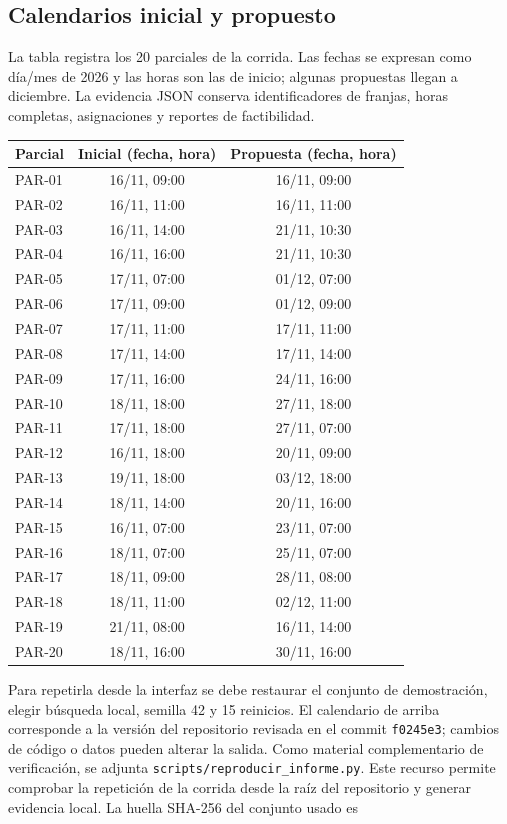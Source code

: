 \documentclass[12pt,letterpaper]{article}
\begin{document}
\subsection{Calendarios inicial y propuesto}
La tabla registra los 20 parciales de la corrida. Las fechas se expresan como día/mes de 2026 y las horas son las de inicio; algunas propuestas llegan a diciembre. La evidencia JSON conserva identificadores de franjas, horas completas, asignaciones y reportes de factibilidad.
\begin{center}
\begingroup\singlespacing\small
\begin{tabular}{lcc}
\toprule
Parcial & Inicial (fecha, hora) & Propuesta (fecha, hora)\\
\midrule
PAR-01 & 16/11, 09:00 & 16/11, 09:00\\
PAR-02 & 16/11, 11:00 & 16/11, 11:00\\
PAR-03 & 16/11, 14:00 & 21/11, 10:30\\
PAR-04 & 16/11, 16:00 & 21/11, 10:30\\
PAR-05 & 17/11, 07:00 & 01/12, 07:00\\
PAR-06 & 17/11, 09:00 & 01/12, 09:00\\
PAR-07 & 17/11, 11:00 & 17/11, 11:00\\
PAR-08 & 17/11, 14:00 & 17/11, 14:00\\
PAR-09 & 17/11, 16:00 & 24/11, 16:00\\
PAR-10 & 18/11, 18:00 & 27/11, 18:00\\
PAR-11 & 17/11, 18:00 & 27/11, 07:00\\
PAR-12 & 16/11, 18:00 & 20/11, 09:00\\
PAR-13 & 19/11, 18:00 & 03/12, 18:00\\
PAR-14 & 18/11, 14:00 & 20/11, 16:00\\
PAR-15 & 16/11, 07:00 & 23/11, 07:00\\
PAR-16 & 18/11, 07:00 & 25/11, 07:00\\
PAR-17 & 18/11, 09:00 & 28/11, 08:00\\
PAR-18 & 18/11, 11:00 & 02/12, 11:00\\
PAR-19 & 21/11, 08:00 & 16/11, 14:00\\
PAR-20 & 18/11, 16:00 & 30/11, 16:00\\
\bottomrule
\end{tabular}\endgroup
\end{center}
Para repetirla desde la interfaz se debe restaurar el conjunto de demostración, elegir búsqueda local, semilla 42 y 15 reinicios. El calendario de arriba corresponde a la versión del repositorio revisada en el commit \texttt{f0245e3}; cambios de código o datos pueden alterar la salida. Como material complementario de verificación, se adjunta \texttt{scripts/reproducir\_informe.py}. Este recurso permite comprobar la repetición de la corrida desde la raíz del repositorio y generar evidencia local. La huella SHA-256 del conjunto usado es
\end{document}

